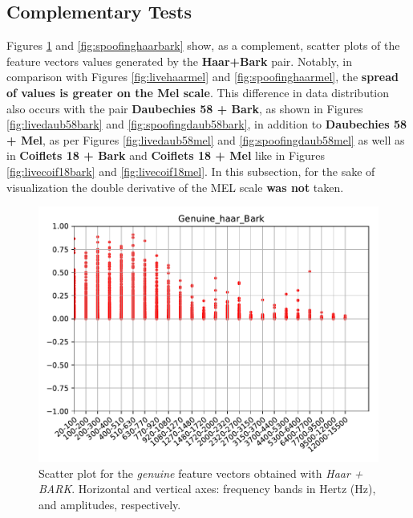 	\FloatBarrier
	
	\subsection{Complementary Tests}
		\par Figures \ref{fig:livehaarbark} and \ref{fig:spoofinghaarbark} show, as a complement, scatter plots of the feature vectors values generated by the \textbf{Haar+Bark} pair. Notably, in comparison with Figures \ref{fig:livehaarmel} and \ref{fig:spoofinghaarmel}, the \textbf{spread of values is greater on the Mel scale}. This difference in data distribution also occurs with the pair \textbf{Daubechies 58 + Bark}, as shown in Figures \ref{fig:livedaub58bark} and \ref{fig:spoofingdaub58bark}, in addition to \textbf{Daubechies 58 + Mel}, as per Figures \ref{fig:livedaub58mel} and \ref{fig:spoofingdaub58mel} as well as in \textbf{Coiflets 18 + Bark} and \textbf{Coiflets 18 + Mel} like in Figures \ref{fig:livecoif18bark} and \ref{fig:livecoif18mel}. In this subsection, for the sake of visualization the double derivative of the MEL scale \textbf{was not} taken.
		\\
		\begin{figure}
			\centering
			\includegraphics[scale=.7]{images/results/barkVersusMel/Genuine_haar_Bark.pdf}
			\caption{Scatter plot for the \textit{genuine} feature vectors obtained with \textit{Haar + BARK}. Horizontal and vertical axes: frequency bands in Hertz (Hz), and amplitudes, respectively.}
			\label{fig:livehaarbark}
		\end{figure}

